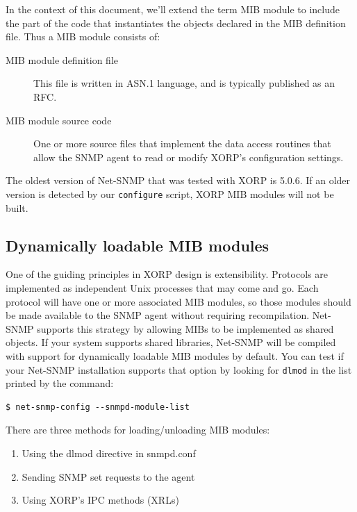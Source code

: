\documentclass[11pt]{article}
\begin{document}
In the context of this document, we'll extend the term MIB module to include
the part of the code that instantiates the objects declared in the MIB
definition file.  Thus a MIB module consists of:

\begin{description}
    \item[MIB module definition file] This file is written in ASN.1 language,
    and is typically published as an RFC.
    \item[MIB module source code] One or more source files that implement the
    data access routines that allow the SNMP agent to read or modify XORP's
    configuration settings. 
\end{description} 

The oldest version of Net-SNMP that was tested with XORP is 5.0.6.  If an older version is detected by our \texttt{configure} script, XORP MIB modules will not be built.




\subsection{Dynamically loadable MIB modules}
\label{sec:MIB_module_format}

One of the guiding principles in XORP design is extensibility.  Protocols are
implemented as independent Unix processes that may come and go.  Each protocol
will have one or more associated MIB modules, so those modules should be made
available to the SNMP agent without requiring recompilation.  Net-SNMP supports
this strategy by allowing MIBs to be implemented as shared objects.  If your
system supports shared libraries, Net-SNMP will be compiled with support for
dynamically loadable MIB modules by default.  You can test if your Net-SNMP
installation supports that option by looking for \texttt{dlmod} in the list
printed by the command:

\begin{verbatim}
$ net-snmp-config --snmpd-module-list
\end{verbatim}


There are three methods for loading/unloading MIB modules:  

\begin{enumerate}
\item Using the dlmod directive in snmpd.conf 
\item Sending SNMP set requests to the agent
\item Using XORP's IPC methods (XRLs)
\end{enumerate}
\end{document}
